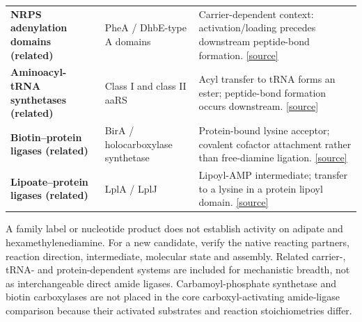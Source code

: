 \documentclass{article}
\begin{document}
\begin{tabularx}{\textwidth}{@{}>{\raggedright\arraybackslash}p{3.9in}>{\raggedright\arraybackslash}p{3.25in}Y@{}}
\textbf{NRPS adenylation domains (related)} & PheA / DhbE-type A domains & Carrier-dependent context: activation/loading precedes downstream peptide-bond formation. \href{https://doi.org/10.1002/ange.201804592}{[source]} \\[5pt]
\textbf{Aminoacyl-tRNA synthetases (related)} & Class I and class II aaRS & Acyl transfer to tRNA forms an ester; peptide-bond formation occurs downstream. \href{https://doi.org/10.1186/1471-2164-13-621}{[source]} \\[5pt]
\textbf{Biotin--protein ligases (related)} & BirA / holocarboxylase synthetase & Protein-bound lysine acceptor; covalent cofactor attachment rather than free-diamine ligation. \href{https://iubmb.qmul.ac.uk/enzyme/EC6/3/4/15.html}{[source]} \\[5pt]
\textbf{Lipoate--protein ligases (related)} & LplA / LplJ & Lipoyl-AMP intermediate; transfer to a lysine in a protein lipoyl domain. \href{https://iubmb.qmul.ac.uk/enzyme/EC6/3/1/20.html}{[source]} \\[5pt]
\bottomrule\end{tabularx}\par\vspace{13pt}
{\fontsize{13}{16}\selectfont A family label or nucleotide product does not establish activity on adipate and hexamethylenediamine. For a new candidate, verify the native reacting partners, reaction direction, intermediate, molecular state and assembly. Related carrier-, tRNA- and protein-dependent systems are included for mechanistic breadth, not as interchangeable direct amide ligases. Carbamoyl-phosphate synthetase and biotin carboxylases are not placed in the core carboxyl-activating amide-ligase comparison because their activated substrates and reaction stoichiometries differ.}
\end{document}
